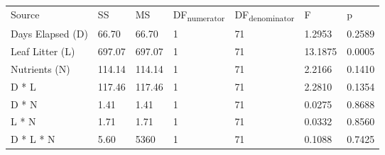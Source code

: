 \begin{table}
\label{tab:SOD_ANOVA}
\begin{tabular}{ l l l l l l l }

Source           & SS      & MS     & DF\textsubscript{numerator} & DF\textsubscript{denominator} & F       & p  \\
Days Elapsed (D) & 66.70   & 66.70  & 1                           & 71                            & 1.2953  & 0.2589 \\
Leaf Litter (L)  & 697.07  & 697.07 & 1                           & 71                            & 13.1875 & 0.0005 \\
Nutrients (N)    & 114.14  & 114.14 & 1                           & 71                            & 2.2166  & 0.1410 \\
D * L            & 117.46  & 117.46 & 1                           & 71                            & 2.2810  & 0.1354 \\
D * N            & 1.41    & 1.41   & 1                           & 71                            & 0.0275  & 0.8688 \\
L * N            & 1.71    & 1.71   & 1                           & 71                            & 0.0332  & 0.8560 \\
D * L * N        & 5.60    & 5360   & 1                           & 71                            & 0.1088  & 0.7425 \\

\end{tabular}
\end{table}